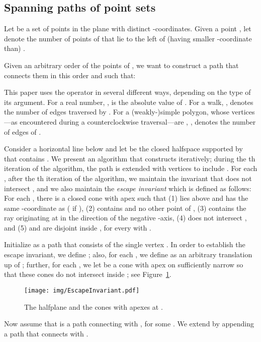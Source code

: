 \documentclass[11pt]{patmorin}
\begin{document}
\subsection{Spanning paths of point sets}
Let  be a set of  points in the plane with distinct -coordinates. 
Given a point , let  denote the number of points of  that lie to the left of (having smaller -coordinate than) .

Given an arbitrary order  of the points of , we want to construct a path  that connects them in this order and such that:  

This paper uses the  operator in several different ways, depending on the type of its argument.  For a real number, ,  is the absolute value of .  For a walk, ,  denotes the number of edges traversed by . For a (weakly-)simple polygon,  whose vertices---as encountered during a counterclockwise traversal---are , , denotes the number of edges of .

Consider a horizontal line  below  and let  be the closed halfspace supported by  that contains .  We present an algorithm that constructs  iteratively; during the th iteration of the algorithm, the path is extended with  vertices to include .  For each , after the th iteration of the algorithm, we maintain the invariant that  does not intersect , and we also maintain the \emph{escape invariant} which is defined as follows:
For each , there is a closed cone  with apex  such that (1)  lies above  and has the same -coordinate as  ( if ), (2)  contains  and no other point of , (3)  contains the ray originating at  in the direction of the negative -axis, (4)  does not intersect , and (5)  and  are disjoint inside , for every  with .

Initialize  as a path that consists of the single vertex . In order to establish the escape invariant, we define ; also, for each , we define  as an arbitrary translation up of ; further, for each , we let  be a cone with apex on  sufficiently narrow so that these cones do not intersect inside ; see Figure~\ref{fig:Escape Invariant}.

\begin{figure}[tb]
\centering 
\texttt{[image: img/EscapeInvariant.pdf]}
\caption{The halfplane  and the cones  with apexes at .}
\label{fig:Escape Invariant}
\end{figure}



Now assume that  is a path connecting  with , for some . We extend  by appending a
path that connects  with .
\end{document}
